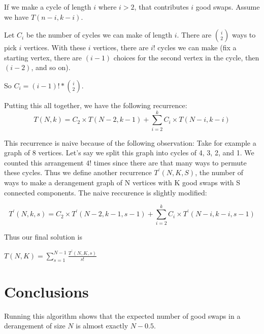 \documentclass[12pt]{article}
\begin{document}
If we make a cycle of length $i$ where $i > 2$, that contributes
$i$ good swaps. Assume we have $T(n - i, k - i)$.

Let $C_i$ be the number of cycles we can make of length $i$.
There are ${i \choose 2}$ ways to pick $i$ vertices. With these $i$ vertices,
there are $i!$ cycles we can make (fix a starting vertex, there
are $(i - 1)$ choices for the second vertex in the cycle,
then $(i - 2)$, and so on). 

So $C_i = (i - 1)! * {i \choose 2}$.

Putting this all together, we have the following recurrence:
\[ T(N, k) =
C_2 \times T(N - 2, k - 1) +
\sum_{i = 2}^{k}{C_i \times T(N-i, k-i)} \]

This recurrence is naive because of the following observation:
Take for example a graph of 8 vertices. Let's say we split this
graph into cycles of 4, 3, 2, and 1. We counted this
arrangement $4!$ times since there are that many ways to permute these
cycles. Thus we define another recurrence $T^\prime(N, K, S)$, the number
of ways to make a derangement graph of N vertices with K good swaps
with S connected components. The naive reccurence is slightly modified:

\[ T^\prime(N, k, s) =
C_2 \times T^\prime(N - 2, k - 1, s-1) +
\sum_{i = 2}^{k}{C_i \times T^\prime(N-i, k-i, s-1)} \]

Thus our final solution is

$ T(N, K) = \sum_{s = 1}^{N - 1}{\frac{T^\prime(N, K, s)}{s!}} $

\section{Conclusions}\label{conclusions}
Running this algorithm shows that the expected number of good swaps
in a derangement of size $N$ is almost exactly $N - 0.5$.

% 
% 
\end{document}

